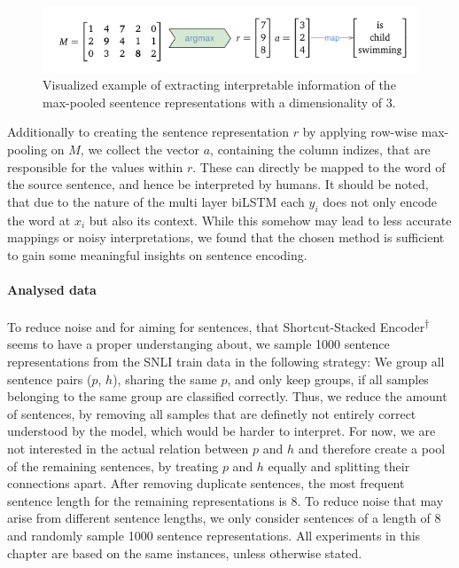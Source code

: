 \begin{figure}[tph!]
\centering
	\includegraphics[totalheight=2cm]{fig/example_process_understanding.png}
	\caption{Visualized example of extracting interpretable information of the max-pooled seentence representations with a dimensionality of 3.}
	\label{fig:example_process_understanding}
\end{figure}
Additionally to creating the sentence representation $r$ by applying row-wise max-pooling on $M$, we collect the vector $a$, containing the column indizes, that are responsible for the values within $r$. These can directly be mapped to the word of the source sentence, and hence be interpreted by humans. It should be noted, that due to the nature of the multi layer \ac{biLSTM} each $y_i$ does not only encode the word at $x_i$ but also its context. While this somehow may lead to less accurate mappings or noisy interpretations, we found that the chosen method is sufficient to gain some meaningful insights on sentence encoding.

\paragraph*{Analysed data}\label{sec:understanding1_analysed_data}
To reduce noise and for aiming for sentences, that Shortcut-Stacked Encoder\textsuperscript{$\dagger$} seems to have a proper understanging about, we sample 1000 sentence representations from the \ac{SNLI} train data in the following strategy: We group all sentence pairs ($p$, $h$), sharing the same $p$, and only keep groups, if all samples belonging to the same group are classified correctly. Thus, we reduce the amount of sentences, by removing all samples that are definetly not entirely correct understood by the model, which would be harder to interpret. For now, we are not interested in the actual relation between $p$ and $h$ and therefore create a pool of the remaining sentences, by treating $p$ and $h$ equally and splitting their connections apart. After removing duplicate sentences, the most frequent sentence length for the remaining representations is 8. To reduce noise that may arise from different sentence lengths, we only consider sentences of a length of 8 and randomly sample 1000 sentence representations. All experiments in this chapter are based on the same instances, unless otherwise stated.
\newline

